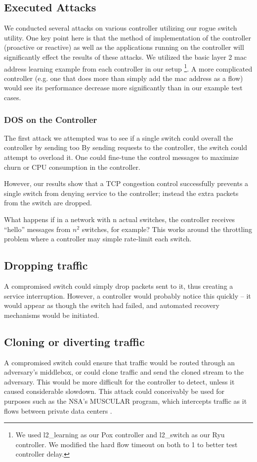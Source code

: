 \subsection{Executed Attacks} We conducted several attacks on various controller utilizing our rogue switch utility. One key point here is that the method of implementation of the controller (proactive or reactive) as well as the applications running on the controller will significantly effect the results of these attacks. We utilized the basic layer 2 mac address learning example from each controller in our setup \footnote{We used l2\_learning as our Pox controller and l2\_switch as our Ryu controller. We modified the hard flow timeout on both to 1 to better test controller delay.}. A more complicated controller (e.g. one that does more than simply add the mac address as a flow) would see its performance decrease more significantly than in our example test cases.

 \subsubsection{DOS on the Controller}
 The first attack we attempted was to see if a single switch could overall the controller by sending too
By sending requests to the controller, the switch could attempt to overload it. One could fine-tune the control messages to maximize churn or CPU consumption in the controller.

However, our results show that a TCP congestion control successfully prevents a single switch from denying service to the controller; instead the extra packets from the switch are dropped.

What happens if in a network with n actual switches, the controller receives “hello” messages from $n^2$ switches, for example? This works around the throttling problem where a controller may simple rate-limit each switch.

\subsection{Dropping traffic} 
A compromised switch could simply drop packets sent to it, thus creating a service interruption. However, a controller would probably notice this quickly -- it would appear as though the switch had failed, and automated recovery mechanisms would be initiated.

\subsection{Cloning or diverting traffic}
A compromised switch could ensure that traffic would be routed through an adversary’s middlebox, or could clone traffic and send the cloned stream to the adversary. This would be more difficult for the controller to detect, unless it caused considerable slowdown. This attack could conceivably be used for purposes such as the NSA’s MUSCULAR program, which intercepts traffic as it flows between private data centers \cite{muscular}. 


